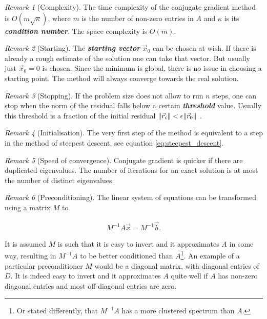 \documentclass{article}
\theoremstyle{plain} %
\theoremstyle{convention} %
\theoremstyle{remark} %
\newtheorem*{remark}{Remark} %
\def\df#1{\textbf{\textit{#1}}}
\numberwithin{equation}{section}
\begin{document}
\begin{remark}[Complexity]
    The time complexity of the conjugate gradient method is $O(m \sqrt{\kappa})$, where $m$ is the number of non-zero entries in $A$ and $\kappa$ is its \df{condition number}. The space complexity is $O(m)$.
\end{remark}

\begin{remark}[Starting]
    The \df{starting vector} $\vec{x}_0$ can be chosen at wish. If there is already a rough estimate of the solution one can take that vector. But usually just $\vec{x}_0 = 0$ is chosen. Since the minimum is global, there is no issue in choosing a starting point. The method will always converge towards the real solution.
\end{remark}

\begin{remark}[Stopping]
    If the problem size does not allow to run $n$ steps, one can stop when the norm of the residual falls below a certain \df{threshold} value. Usually this threshold is a fraction of the initial residual $\norm{\vec{r}_i} < \epsilon \norm{\vec{r}_0}$ \cite{shewchuk1994}.
\end{remark}

\begin{remark}[Initialisation]
    The very first step of the method is equivalent to a step in the method of steepest descent, see equation \eqref{eq:steepest_descent}.
\end{remark}

\begin{remark}[Speed of convergence]
    Conjugate gradient is quicker if there are duplicated eigenvalues. The number of iterations for an exact solution is at most the number of distinct eigenvalues.
\end{remark}

\begin{remark}[Preconditioning]
    The linear system of equations can be transformed using a matrix $M$ to

    \begin{align*}
        M^{-1} A \vec{x} = M^{-1} \vec{b}.
    \end{align*}

    It is assumed $M$ is such that it is easy to invert and it approximates $A$ in some way, resulting in $M^{-1} A$ to be better conditioned than $A$\footnote{Or stated differently, that $M^{-1}A$ has a more clustered spectrum than $A$.}. An example of a particular preconditioner $M$ would be a diagonal matrix, with diagonal entries of $D$. It is indeed easy to invert and it approximates $A$ quite well if $A$ has non-zero diagonal entries and most off-diagonal entries are zero.
\end{remark}
\end{document}
